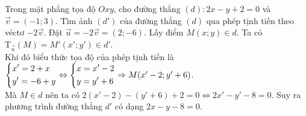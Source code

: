 \begin{bt}%
	Trong mặt phẳng tọa độ $Oxy$, cho đường thẳng $(d)\colon 2x-y+2=0$ và $\vec{v}=(-1;3)$. Tìm ảnh $(d')$ của đường thẳng $(d)$ qua phép tịnh tiến theo véctơ $-2\vec{v}$.
	\loigiai
	{
	Đặt $\vec{u}=-2\vec{v}=(2;-6)$. Lấy điểm $M(x;y)\in d$. Ta có $\mathrm{T}_{\vec{u}}(M)=M'(x';y')\in d'$.\\
	Khi đó biểu thức tọa độ của phép tịnh tiến là $\left\{\begin{aligned}&x'=2+x\\&y'=-6+y\end{aligned}\right.\Leftrightarrow\left\{\begin{aligned}&x=x'-2\\&y=y'+6\end{aligned}\right.\Rightarrow M(x'-2;y'+6)$.\\
	Mà $M\in d$ nên ta có $2(x'-2)-(y'+6)+2=0\Leftrightarrow 2x'-y'-8=0$. Suy ra phương trình đường thẳng $d'$ có dạng $2x-y-8=0$.
	}
	\end{bt}


